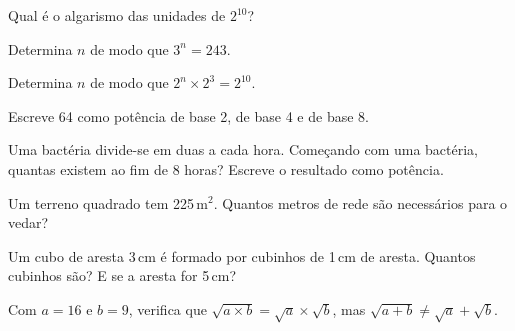 \documentclass[12pt]{article}
\begin{document}
\begin{exercicios}
  \item Qual é o algarismo das unidades de $2^{10}$?
  \item Determina $n$ de modo que $3^n = 243$.
  \item Determina $n$ de modo que $2^n \times 2^3 = 2^{10}$.
  \item Escreve 64 como potência de base 2, de base 4 e de base 8.
  \item Uma bactéria divide-se em duas a cada hora. Começando com uma bactéria, quantas existem ao fim de 8 horas? Escreve o resultado como potência.
  \item Um terreno quadrado tem 225\,m$^2$. Quantos metros de rede são necessários para o vedar?
  \item Um cubo de aresta 3\,cm é formado por cubinhos de 1\,cm de aresta. Quantos cubinhos são? E se a aresta for 5\,cm?
  \item Com $a = 16$ e $b = 9$, verifica que $\sqrt{a \times b} = \sqrt a \times \sqrt b$, mas $\sqrt{a + b} \neq \sqrt a + \sqrt b$.
\end{exercicios}
\end{document}

